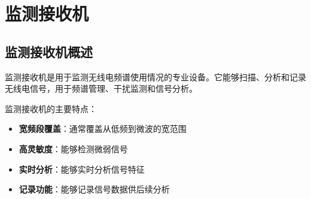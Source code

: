 
\chapter{监测接收机}
\label{chap:monitoring_receiver}

\section{监测接收机概述}
\label{sec:monitoring_receiver_intro}

监测接收机是用于监测无线电频谱使用情况的专业设备。它能够扫描、分析和记录无线电信号，用于频谱管理、干扰监测和信号分析。

监测接收机的主要特点：
\begin{itemize}
    \item \textbf{宽频段覆盖}：通常覆盖从低频到微波的宽范围
    \item \textbf{高灵敏度}：能够检测微弱信号
    \item \textbf{实时分析}：能够实时分析信号特征
    \item \textbf{记录功能}：能够记录信号数据供后续分析
\end{itemize}


